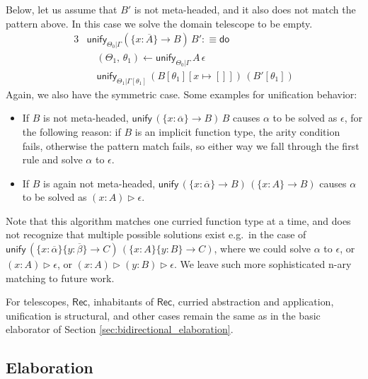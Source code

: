\documentclass[acmsmall,review,anonymous,prologue,dvipsnames]{acmart}\settopmatter{printfolios=true,printccs=false,printacmref=false}
\newcommand{\unify}{\mathsf{unify}}
\newcommand{\edo}{\boldsymbol{\mathsf{do}}}
\newcommand{\TCons}{\triangleright}
\newcommand{\Rec}{\mathsf{Rec}}
\newcommand{\ol}[1]{\overline{#1}}
\theoremstyle{remark}
\begin{document}
Below, let us assume that $B'$ is not meta-headed, and it also does not match
the pattern above. In this case we solve the domain telescope to be empty.
\begin{alignat*}{3}
& \unify_{\Theta_0|\Gamma}(\{x : \ol{A}\}\to B)\,B' :\equiv \edo\\
& \quad (\Theta_1,\,\theta_1) \leftarrow \unify_{\Theta_0|\Gamma}\,A\,\epsilon\\
& \quad \unify_{\Theta_1|\Gamma[\theta_1]}\,(B[\theta_1][x\mapsto[]])\,(B'[\theta_1])
\end{alignat*}
Again, we also have the symmetric case. Some examples for unification behavior:
\begin{itemize}
\item If $B$ is not meta-headed, $\unify\,(\{x : \ol{\alpha}\}\to B)\,B$ causes
  $\alpha$ to be solved as $\epsilon$, for the following reason: if $B$ is an
  implicit function type, the arity condition fails, otherwise the pattern match
  fails, so either way we fall through the first rule and solve $\alpha$ to
  $\epsilon$.
\item If $B$ is again not meta-headed, $\unify\,(\{x : \ol{\alpha}\}\to B)\,(\{x
  : A\}\to B)$ causes $\alpha$ to be solved as $(x : A) \TCons \epsilon$.
\end{itemize}
Note that this algorithm matches one curried function type at a time, and does
not recognize that multiple possible solutions exist e.g.\ in the case of
$\unify\,(\{x : \ol{\alpha}\}\{y : \ol{\beta}\}\to C)\,(\{x : A\}\{y : B\}\to
C)$, where we could solve $\alpha$ to $\epsilon$, or $(x : A)\TCons\epsilon$, or
$(x : A)\TCons(y : B)\TCons\epsilon$. We leave such more sophisticated n-ary
matching to future work.

For telescopes, $\Rec$, inhabitants of $\Rec$, curried abstraction and
application, unification is structural, and other cases remain the same as in
the basic elaborator of Section \ref{sec:bidirectional_elaboration}.

\subsection{Elaboration}
\end{document}
